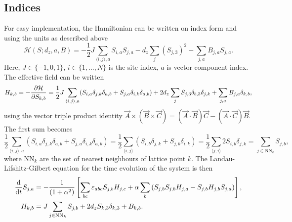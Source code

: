 \documentclass{article}
\begin{document}
    \subsection*{Indices}
    For easy implementation, the Hamiltonian can be written on index form and using the units as described above
    \begin{equation*}
        \mathcal{H}(S; d_z, a, B) = -\frac{1}{2} J \sum_{\langle i, j \rangle, a} S_{i, a} S_{j, a} - d_z \sum_{j} (S_{j,3})^2 -  \sum_{j, a} B_{j, a} S_{j,a}.
    \end{equation*}
    Here, $J\in\{-1, 0, 1\}$, $i\in\{1, ..., N\}$ is the site index, $a$ is vector component index. The effective field can be written
    \begin{align*}
        H_{k, b} = - \pdv{\mathcal{H}}{S_{k, b}} = \frac{1}{2} J \sum_{\langle i, j \rangle, a} (S_{i, a}\delta_{j,k}\delta_{a, b} + S_{j, a}\delta_{i,k}\delta_{a, b}) + 2 d_z \sum_{j} S_{j,3} \delta_{b, 3}\delta_{j, k} +  \sum_{j, a} B_{j, a} \delta_{k,b},
    \end{align*}
    using the vector triple product identity $\vec A \times (\vec B \times \vec C) = (\vec A \cdot \vec B) \vec C - (\vec A \cdot \vec C) \vec B$. The first sum becomes
    \begin{equation*}
        \frac{1}{2}\sum_{\langle i, j \rangle, a} (S_{i, a}\delta_{j,k}\delta_{a, b} + S_{j, a}\delta_{i,k}\delta_{a, b}) = \frac{1}{2}\sum_{\langle i, j \rangle} (S_{i, b}\delta_{j,k} + S_{j, b}\delta_{i,k}) = \frac{1}{2}\sum_{\langle j, i \rangle} 2S_{i, b} \delta_{j, k} = \sum_{j \in \mathrm{NN}_k} S_{j, b},
    \end{equation*}
    where $\mathrm{NN}_k$ are the set of nearest neighbours of lattice point $k$. The Landau-Lifshitz-Gilbert equation for the time evolution of the system is then
    \begin{align}
        \dv{t} S_{j, a} &= - \frac{1}{(1 + \alpha^2)}\left[\sum_{b c}\varepsilon_{abc}S_{j, b}H_{j,c} + \alpha \sum_{b}\left(S_{j, b}S_{j, b}H_{j, a} - S_{j, b}H_{j, b}S_{j, a}\right)\right], \label{LLG} \\
        H_{k, b} &= J\sum_{j \in \mathrm{NN}_k} S_{j, b} + 2d_z S_{k, 3} \delta_{k, 3} +  B_{k, b}. \label{effective field}
    \end{align}

    
\end{document}
